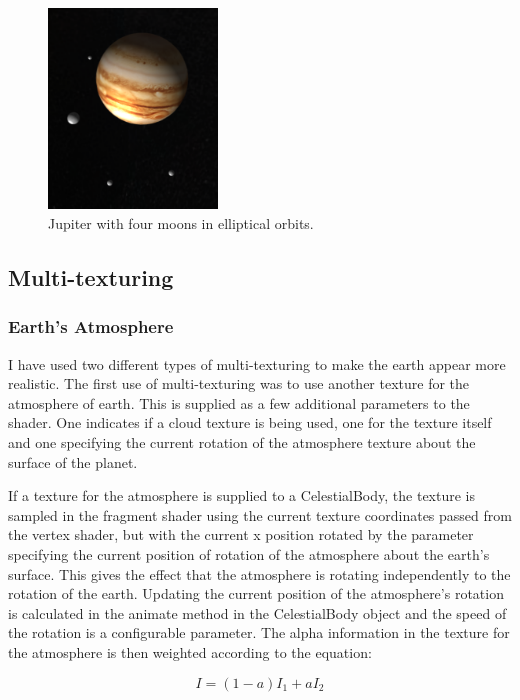 \documentclass[paper=a4, fontsize=11pt]{scrartcl}	%
\numberwithin{equation}{section}															%
\numberwithin{figure}{section}																%
\numberwithin{table}{section}																%
\begin{document}
\begin{figure}[H]
\centering
\includegraphics[width=0.4\textwidth]{img/jupiter_moons.png}
\caption{Jupiter with four moons in elliptical orbits.}
\label{fig:jupiter-moons-elliptical}
\end{figure}

\subsection{Multi-texturing}

\subsubsection{Earth's Atmosphere}
I have used two different types of multi-texturing to make the earth appear more realistic. The first use of multi-texturing was to use another texture for the atmosphere of earth. This is supplied as a few additional parameters to the shader. One indicates if a  cloud texture is being used, one for the texture itself and one specifying the current rotation of the atmosphere texture about the surface of the planet.

If a texture for the atmosphere is supplied to a CelestialBody, the texture is sampled in the fragment shader using the current texture coordinates passed from the vertex shader, but with the current x position rotated by the parameter specifying the current position of rotation of the atmosphere about the earth's surface. This gives the effect that the atmosphere is rotating independently to the rotation of the earth. Updating the current position of the atmosphere's rotation is calculated in the animate method in the CelestialBody object and the speed of the rotation is a configurable parameter. The alpha information in the texture for the atmosphere is then weighted according to the equation:

\begin{equation} \label{eq:transparent-texture}
I = (1-a)I_1 + aI_2
\end{equation}
\end{document}

